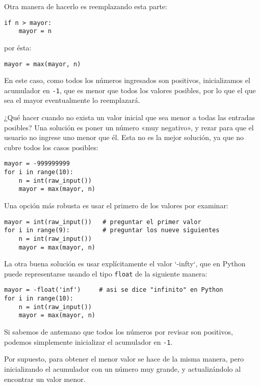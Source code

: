 Otra manera de hacerlo es reemplazando esta parte:

\begin{lstlisting}
if n > mayor:
    mayor = n
\end{lstlisting}

por ésta:

\begin{lstlisting}
mayor = max(mayor, n)
\end{lstlisting}

En este caso, como todos los números ingresados son positivos,
inicializamos el acumulador en \lstinline!-1!, que es menor que todos
los valores posibles, por lo que el que sea el mayor eventualmente lo
reemplazará.

¿Qué hacer cuando no exista un valor inicial que sea menor a todas las
entradas posibles? Una solución es poner un número «muy negativo», y
rezar para que el usuario no ingrese uno menor que él. Esta no es la
mejor solución, ya que no cubre todos los casos posibles:

\begin{lstlisting}
mayor = -999999999
for i in range(10):
    n = int(raw_input())
    mayor = max(mayor, n)
\end{lstlisting}

Una opción más robusta es usar el primero de los valores por examinar:

\begin{lstlisting}
mayor = int(raw_input())   # preguntar el primer valor
for i in range(9):         # preguntar los nueve siguientes
    n = int(raw_input())
    mayor = max(mayor, n)
\end{lstlisting}

La otra buena solución es usar explícitamente el valor `-infty`, que en
Python puede representarse usando el tipo \lstinline!float! de la
siguiente manera:

\begin{lstlisting}
mayor = -float('inf')     # asi se dice "infinito" en Python
for i in range(10):
    n = int(raw_input())
    mayor = max(mayor, n)
\end{lstlisting}

Si sabemos de antemano que todos los números por revisar son positivos,
podemos simplemente inicializar el acumulador en \lstinline!-1!.

Por supuesto, para obtener el menor valor se hace de la misma manera,
pero inicializando el acumulador con un número muy grande, y
actualizándolo al encontrar un valor menor.

